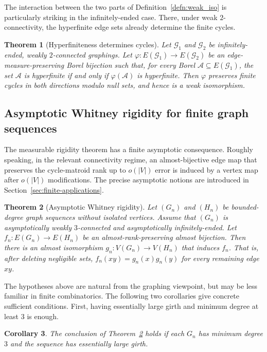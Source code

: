 \documentclass{article}
\theoremstyle{plain}
\newtheorem{thm}{Theorem}[section]
\newtheorem{cor}[thm]{Corollary}
\theoremstyle{definition}
\newcommand{\cA}{\mathcal{A}}
\newcommand{\cG}{\mathcal{G}}
\begin{document}
The interaction between the two parts of Definition~\ref{defn:weak_iso} is particularly striking in the infinitely-ended case. There, under weak $2$-connectivity, the hyperfinite edge sets already determine the finite cycles.

\begin{thm}[Hyperfiniteness determines cycles]\label{thm:hyperfinite_sees_cycle}
    Let $\cG_1$ and $\cG_2$ be infinitely-ended, weakly $2$-connected graphings. Let $\varphi:E(\cG_1)\to E(\cG_2)$ be an edge-measure-preserving Borel bijection such that, for every Borel $\cA\subseteq E(\cG_1)$, the set $\cA$ is hyperfinite if and only if $\varphi(\cA)$ is hyperfinite. Then $\varphi$ preserves finite cycles in both directions modulo null sets, and hence is a weak isomorphism.
\end{thm}

\subsection{Asymptotic Whitney rigidity for finite graph sequences}

The measurable rigidity theorem has a finite asymptotic consequence. Roughly speaking, in the relevant connectivity regime, an almost-bijective edge map that preserves the cycle-matroid rank up to $o(|V|)$ error is induced by a vertex map after $o(|V|)$ modifications. The precise asymptotic notions are introduced in Section~\ref{sec:finite-applications}.

\begin{thm}[Asymptotic Whitney rigidity]\label{thm:finite-whitney-stability}
Let $(G_n)$ and $(H_n)$ be bounded-degree graph sequences without isolated vertices. Assume that $(G_n)$ is asymptotically weakly $3$-connected and asymptotically infinitely-ended. Let $f_n:E(G_n)\to E(H_n)$ be an almost-rank-preserving almost bijection. Then there is an almost isomorphism $g_n:V(G_n)\to V(H_n)$ that induces $f_n$. That is, after deleting negligible sets, $f_n(xy)=g_n(x)g_n(y)$ for every remaining edge $xy$.
\end{thm}

The hypotheses above are natural from the graphing viewpoint, but may be less familiar in finite combinatorics. The following two corollaries give concrete sufficient conditions. First, having essentially large girth and minimum degree at least 3 is enough.

\begin{cor}\label{cor:min_3_deg_large_girth}
    The conclusion of Theorem~\ref{thm:finite-whitney-stability} holds if each $G_n$ has minimum degree $3$ and the sequence has essentially large girth.
\end{cor} 
\end{document}
